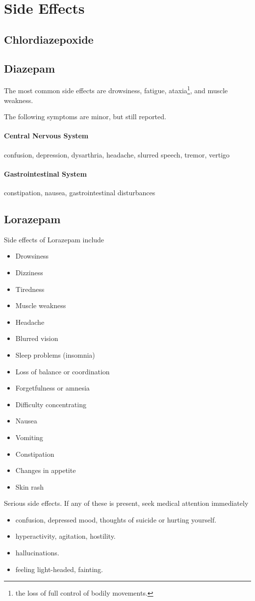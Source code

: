 \chapter{Side Effects}
\section{Chlordiazepoxide}

\section{Diazepam}
The most common side effects are drowsiness, fatigue, ataxia\footnote{the loss of full control of bodily movements.
}, and muscle weakness.

The following symptoms are minor, but still reported.
\subsubsection{Central Nervous System} confusion, depression, dysarthria, headache, slurred speech, tremor, vertigo

\subsubsection{Gastrointestinal System} constipation, nausea, gastrointestinal disturbances

\section{Lorazepam} 
Side effects of Lorazepam include
\begin{itemize}
\item Drowsiness
\item Dizziness
\item Tiredness
\item Muscle weakness
\item Headache
\item Blurred vision
\item Sleep problems (insomnia)
\item Loss of balance or coordination
\item Forgetfulness or amnesia
\item Difficulty concentrating
\item Nausea
\item Vomiting
\item Constipation
\item Changes in appetite
\item Skin rash
\end{itemize}
Serious side effects. If any of these is present, seek medical attention immediately
\begin{itemize}
\item confusion, depressed mood, thoughts of suicide or hurting yourself.
\item hyperactivity, agitation, hostility.
\item hallucinations.
\item feeling light-headed, fainting.
\end{itemize}